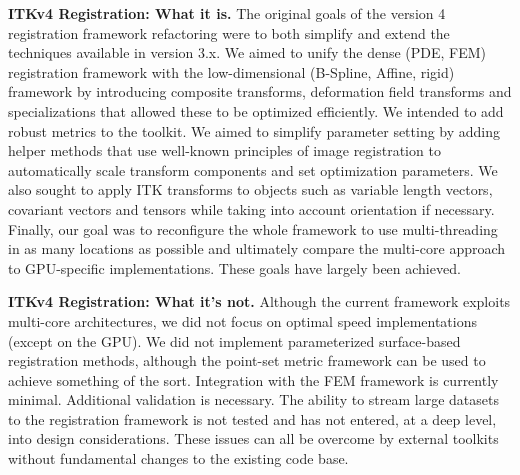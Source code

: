 \documentclass{llncs}
\begin{document}
{\bf ITKv4 Registration: What it is.}
The original goals of the version 4 registration framework refactoring
were to both simplify and extend the techniques available in version
3.x.  We aimed to unify the dense (PDE, FEM) registration framework
with the low-dimensional (B-Spline, Affine, rigid) framework by
introducing composite transforms, deformation field transforms and
specializations that allowed these to be optimized efficiently.  We
intended to add robust metrics to the toolkit.  We aimed to simplify
parameter setting by adding helper methods that use well-known
principles of image registration to automatically scale transform
components and set optimization parameters.  We also sought to apply
ITK transforms to objects such as variable length vectors, covariant
vectors and tensors while taking into account orientation if
necessary.  Finally, our goal was to reconfigure the whole framework
to use multi-threading in as many locations as possible and ultimately
compare the multi-core approach to GPU-specific implementations.
These goals have largely been achieved.  


{\bf ITKv4 Registration: What it's not.} Although the current
framework exploits multi-core architectures, we did not focus on
optimal speed implementations (except on the GPU).  We did not
implement parameterized surface-based registration methods, although
the point-set metric framework can be used to achieve something of the
sort.  Integration with the FEM framework is currently minimal.
Additional validation is necessary.  The ability to stream large
datasets to the registration framework is not tested and has not
entered, at a deep level, into design considerations.  These issues
can all be overcome by external toolkits without fundamental changes
to the existing code base.


\end{document}

